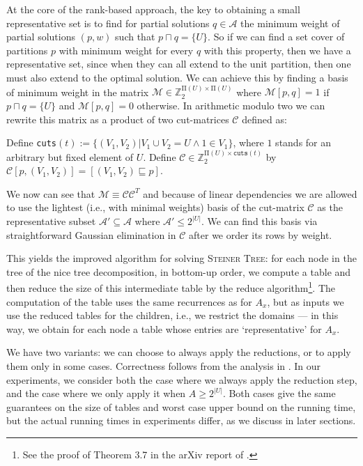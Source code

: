 \documentclass{llncs}
\begin{document}
At the core of the rank-based approach, the key to obtaining a small representative set is to find for partial solutions $q \in \mathcal{A}$ the minimum weight of partial solutions $(p, w)$ such that $p \sqcap q = \{U\}$. So if we can find a set cover of partitions $p$ with minimum weight for every $q$ with this property, then we have a representative set, since when they can all extend to the unit partition, then one must also extend to the optimal solution. We can achieve this by finding a basis of minimum weight in the matrix $\mathcal{M} \in \mathbb{Z}_{2}^{ \mathrm{\Pi }(U)\times\mathrm{\Pi}(U)}$ where $\mathcal{M}[p,q] = 1$ if $p \sqcap q = \{U\}$ and $\mathcal{M}[p,q] = 0$ otherwise. In arithmetic modulo two we can rewrite this matrix as a product of two cut-matrices $\mathcal{C}$ defined as:
\begin{definition}
Define \texttt{cuts}$(t) := \{ (V_{1},V_{2}) | V_{1} \cup V_{2} = U \wedge 1 \in V_{1} \}$, where $1$ stands for an arbitrary but fixed element of $U$. Define $\mathcal{C}\in\mathbb{Z}_{2}^{\mathrm{\Pi}(U)\times\texttt{cuts}(t)}$ by $\mathcal{C} [p, (V_{1}, V_{2})] = [(V_{1},V_{2}) \sqsubseteq p]$.
\end{definition}

We now can see that $\mathcal{M} \equiv \mathcal{CC}^{T}$ and because of linear dependencies we are allowed to use the lightest (i.e., with minimal weights)
basis of the cut-matrix $\mathcal{C}$ as the representative subset $\mathcal{A'} \subseteq \mathcal{A}$ where $\mathcal{A'} \leq 2^{|U|}$. We can find this basis via straightforward Gaussian elimination in $\mathcal{C}$ after we order its rows by weight.

This yields the improved algorithm for solving \textsc{Steiner Tree}: for each node in the tree of the nice tree decomposition, in bottom-up
order, we compute a table and then reduce the size of this intermediate table by the reduce algorithm\footnote{See the proof of Theorem 3.7 in the arXiv report of \cite{BodlaenderCKN12}.}. 
The computation of the table
uses the same recurrences as for $A_x$, but as inputs we use the reduced tables for the children,
i.e., we restrict the domains --- in this way, we obtain for
each node a table whose entries are `representative' for $A_x$.

We have two variants: we can choose to 
always apply the reductions, or to apply them only in some cases. Correctness follows from the analysis in \cite{BodlaenderCKN12}.
In our experiments, we consider both the case where we always apply the reduction step, and the case where we only apply it 
when $A \geq 2^{|U|}$. Both cases give the same guarantees on the size of tables and worst case upper bound on the running time, but the
actual running times in experiments differ, as we discuss in later sections.
\end{document}
